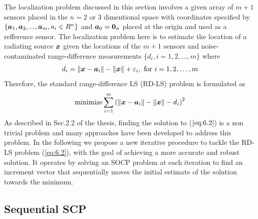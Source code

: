 The localization problem discussed in this section involves a given array of $m+1$ sensors placed in the $n = 2$ or 3 dimentional space with coordinates specified by $\{\mbox{\boldmath$a$}_1, \mbox{\boldmath$a$}_2, . . . , \mbox{\boldmath$a$}_m , a_i \in R^n\}$ and  $\mbox{\boldmath$a$}_0 = \mbox{\boldmath${0}$}_n$ placed at the origin and used as a refference sensor. The localization problem here is to estimate the location of a radiating source $\mbox{\boldmath$x$}$ given the locations of the $m+1$ sensors and noise-contaminated range-difference measurements $\{d_i, i = 1, 2, \ldots, m\}$ where 
\begin{equation} \label{eq:6.1}
d_i = \|\mbox{\boldmath$x$} - \mbox{\boldmath$a$}_i\| - \|\mbox{\boldmath$x$}\| + \varepsilon_i, \mbox{ for } i = 1, 2, \ldots, m
\end{equation}
Therefore, the standard range-difference LS (RD-LS) problem is formulated as
\begin{equation} \label{eq:6.2}
\mathop{\mbox{minimize}} \sum^m_{i=1}\left( \|\mbox{\boldmath$x$} - \mbox{\boldmath$a$}_i\| - \|\mbox{\boldmath$x$}\| - d_i\right)^2
\end{equation}
As described in Sec.2.2 of the thesis, finding the solution to ($\ref{eq:6.2}$) is a non trivial problem and many approaches have been developed to address this problem. In the following we propose a new iterative procedure to tackle the RD-LS problem (\ref{eq:6.2}), with the goal of achieving a more accurate and robust solution. It operates by  solving an SOCP problem at each iteration to find an increment vector  that sequentially moves the initial estimate of the solution towards the minimum.

\subsection{Sequential SCP}

